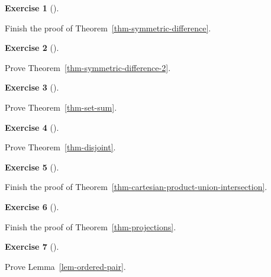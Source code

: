 \documentclass[
  letterpaper,
  10pt,
  reqno,
  twopage,
  openany]{book}
\theoremstyle{plain}
\theoremstyle{definition}
\newtheorem{exercise}{Exercise}[chapter]
\theoremstyle{definition}
\theoremstyle{definition}
\theoremstyle{plain}
\theoremstyle{plain}
\theoremstyle{remark}
\begin{document}
\leavevmode{}%
\begin{exercise}[]\label{exr-symmetric-difference}

Finish the proof of Theorem~\ref{thm-symmetric-difference}.

\end{exercise}

\leavevmode{}%
\begin{exercise}[]\label{exr-symmetric-difference-2}

Prove Theorem~\ref{thm-symmetric-difference-2}.

\end{exercise}

\leavevmode{}%
\begin{exercise}[]\label{exr-set-sum}

Prove Theorem~\ref{thm-set-sum}.

\end{exercise}

\leavevmode{}%
\begin{exercise}[]\label{exr-disjoint}

Prove Theorem~\ref{thm-disjoint}.

\end{exercise}

\leavevmode{}%
\begin{exercise}[]\label{exr-cartesian-product-union-intersection}

Finish the proof of
Theorem~\ref{thm-cartesian-product-union-intersection}.

\end{exercise}

\leavevmode{}%
\begin{exercise}[]\label{exr-projections}

Finish the proof of Theorem~\ref{thm-projections}.

\end{exercise}

\leavevmode{}%
\begin{exercise}[]\label{exr-ordered-pair}

Prove Lemma~\ref{lem-ordered-pair}.

\end{exercise}
\end{document}
